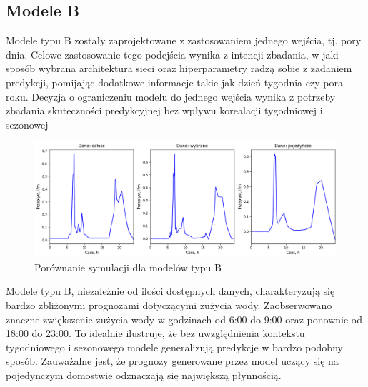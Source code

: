 \documentclass[a4paper,twoside,12pt]{book}
\begin{document}
\subsection*{Modele B}
Modele typu B zostały zaprojektowane z zastosowaniem jednego wejścia, tj. pory dnia. Celowe zastosowanie tego podejścia wynika z intencji zbadania, w jaki sposób wybrana architektura sieci oraz hiperparametry radzą sobie z zadaniem predykcji, pomijając dodatkowe informacje takie jak dzień tygodnia czy pora roku. Decyzja o ograniczeniu modelu do jednego wejścia wynika z potrzeby zbadania skuteczności predykcyjnej bez wpływu korealacji tygodniowej i sezonowej
\begin{figure}[!h]
  \centering
  \includegraphics[width=1\textwidth]{img/Model_B.png}
  \caption{Porównanie symulacji dla modelów typu B}
  \label{fig:etykieta-rysunku}
\end{figure}
Modele typu B, niezależnie od ilości dostępnych danych, charakteryzują się bardzo zbliżonymi prognozami dotyczącymi zużycia wody. Zaobserwowano znaczne zwiększenie zużycia wody w godzinach od 6:00 do 9:00 oraz ponownie od 18:00 do 23:00. To idealnie ilustruje, że bez uwzględnienia kontekstu tygodniowego i sezonowego modele generalizują predykcje w bardzo podobny sposób. Zauważalne jest, że prognozy generowane przez model uczący się na pojedynczym domostwie odznaczają się największą płynnością.

\newpage
\end{document}
